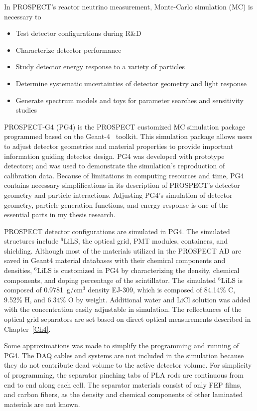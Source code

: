 \label{Ch6}

In PROSPECT's reactor neutrino measurement, Monte-Carlo simulation (MC) is necessary to 
\begin{itemize}
	\item Test detector configurations during R\&D
	\item Characterize detector performance
	\item Study detector energy response to a variety of particles
	\item Determine systematic uncertainties of detector geometry and light response
	\item Generate spectrum models and toys for parameter searches and sensitivity studies
\end{itemize}
PROSPECT-G4 (PG4) is the PROSPECT customized MC simulation package programmed based on the Geant-4~\cite{bib:geant4} toolkit.
This simulation package allows users to adjust detector geometries and material properties to provide important information guiding detector design. 
PG4 was developed with prototype detectors; and was used to demonstrate the simulation's reproduction of calibration data.
Because of limitations in computing resources and time, PG4 contains necessary simplifications in its description of PROSPECT's detector geometry and particle interactions.
Adjusting PG4's simulation of detector geometry, particle generation functions, and energy response is one of the essential parts in my thesis research.


PROSPECT detector configurations are simulated in PG4. 
The simulated structures include $^6$LiLS, the optical grid, PMT modules, containers, and shielding.
Although most of the materials utilized in the PROSPECT AD are saved in Geant4 material databases with their chemical components and densities, $^6$LiLS is customized in PG4 by characterizing the density, chemical components, and doping percentage of the scintillator.
The simulated $^6$LiLS is composed of 0.9781~g/cm$^3$ density EJ-309, which is composed of 84.14\% C, 9.52\% H, and 6.34\% O by weight.
Additional water and LiCl solution was added with the concentration easily adjustable in simulation.
The reflectances of the optical grid separators are set based on direct optical measurements described in Chapter~\ref{Ch4}.

Some approximations was made to simplify the programming and running of PG4.
The DAQ cables and systems are not included in the simulation because they do not contribute dead volume to the active detector volume.
For simplicity of programming, the separator pinching tabs of PLA rods are continuous from end to end along each cell.
The separator materials consist of only FEP films, and carbon fibers, as the density and chemical components of other laminated materials are not known.

